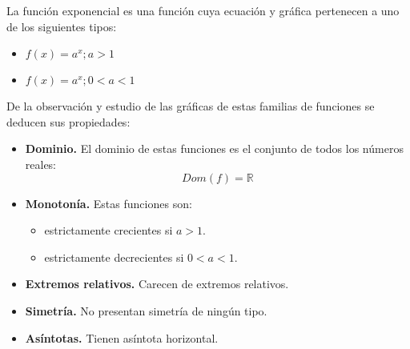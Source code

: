 La función exponencial es una función cuya ecuación y gráfica pertenecen a uno de los siguientes tipos:
\begin{itemize}
	\item $f(x) = a^{x}; a>1$
	\item $f(x) = a^{x}; 0<a<1$
\end{itemize}
De la observación y estudio de las gráficas de estas familias de funciones se deducen sus propiedades:
\begin{itemize}
	\item \textbf{Dominio. }El dominio de estas funciones es el conjunto de todos los números reales:$$Dom(f) = \mathbb{R}$$
	\item \textbf{Monotonía. }Estas funciones son:
	\begin{itemize}
		\item estrictamente crecientes si $a>1$.
		\item estrictamente decrecientes si $0<a<1$.
	\end{itemize}
	\item \textbf{Extremos relativos.} Carecen de extremos relativos.
	\item \textbf{Simetría. }No presentan simetría de ningún tipo.
	\item \textbf{Asíntotas. }Tienen asíntota horizontal.
\end{itemize}
